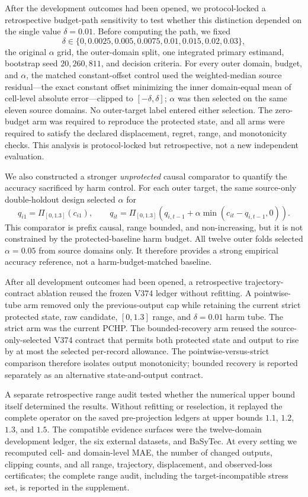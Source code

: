 \documentclass[preprint,12pt]{elsarticle}
\begin{document}
After the development outcomes had been opened, we protocol-locked a retrospective budget-path sensitivity to test whether this distinction depended on the single value $\delta=0.01$. Before computing the path, we fixed
\[
\delta\in\{0,0.0025,0.005,0.0075,0.01,0.015,0.02,0.03\},
\]
the original $\alpha$ grid, the outer-domain split, one integrated primary estimand, bootstrap seed $20{,}260{,}811$, and decision criteria. For every outer domain, budget, and $\alpha$, the matched constant-offset control used the weighted-median source residual---the exact constant offset minimizing the inner domain-equal mean of cell-level absolute error---clipped to $[-\delta,\delta]$; $\alpha$ was then selected on the same eleven source domains. No outer-target label entered either selection. The zero-budget arm was required to reproduce the protected state, and all arms were required to satisfy the declared displacement, regret, range, and monotonicity checks. This analysis is protocol-locked but retrospective, not a new independent evaluation.

We also constructed a stronger \emph{unprotected} causal comparator to quantify the accuracy sacrificed by harm control. For each outer target, the same source-only double-holdout design selected $\alpha$ for
\[
q_{i1}=\Pi_{[0,1.3]}(c_{i1}),\qquad
q_{it}=\Pi_{[0,1.3]}\!\left(q_{i,t-1}+\alpha\min(c_{it}-q_{i,t-1},0)\right).
\]
This comparator is prefix causal, range bounded, and non-increasing, but it is not constrained by the protected-baseline harm budget. All twelve outer folds selected $\alpha=0.05$ from source domains only. It therefore provides a strong empirical accuracy reference, not a harm-budget-matched baseline.

After all development outcomes had been opened, a retrospective trajectory-contract ablation reused the frozen V374 ledger without refitting. A pointwise-tube arm removed only the previous-output cap while retaining the current strict protected state, raw candidate, $[0,1.3]$ range, and $\delta=0.01$ harm tube. The strict arm was the current PCHP. The bounded-recovery arm reused the source-only-selected V374 contract that permits both protected state and output to rise by at most the selected per-record allowance. The pointwise-versus-strict comparison therefore isolates output monotonicity; bounded recovery is reported separately as an alternative state-and-output contract.

A separate retrospective range audit tested whether the numerical upper bound itself determined the results. Without refitting or reselection, it replayed the complete operator on the saved pre-projection ledgers at upper bounds $1.1$, $1.2$, $1.3$, and $1.5$. The compatible evidence surfaces were the twelve-domain development ledger, the six external datasets, and BaSyTec. At every setting we recomputed cell- and domain-level MAE, the number of changed outputs, clipping counts, and all range, trajectory, displacement, and observed-loss certificates; the complete range audit, including the target-incompatible stress set, is reported in the supplement.
\end{document}
